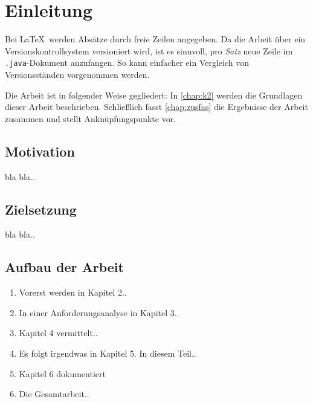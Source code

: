 \chapter{Einleitung}
\label{chap:k1}

Bei \LaTeX\ werden Absätze durch freie Zeilen angegeben.
Da die Arbeit über ein Versionskontrollsystem versioniert wird, ist es sinnvoll, pro \emph{Satz} neue Zeile im \texttt{.java}-Dokument anzufangen.
So kann einfacher ein Vergleich von Versionsständen vorgenommen werden.

Die Arbeit ist in folgender Weise gegliedert:
In \cref{chap:k2} werden die Grundlagen dieser Arbeit beschrieben.
Schließlich fasst \cref{chap:zusfas} die Ergebnisse der Arbeit zusammen und stellt Anknüpfungspunkte vor.

\section{Motivation}

bla bla..


\section{Zielsetzung}

bla bla..


\section{Aufbau der Arbeit}

\begin{enumerate}
\item Vorerst werden in Kapitel 2..
\item In einer Anforderungsanalyse in Kapitel 3..
\item Kapitel 4 vermittelt..
\item Es folgt irgendwas in Kapitel 5. In diesem Teil..
\item Kapitel 6 dokumentiert
\item Die Gesamtarbeit..
\end{enumerate}

